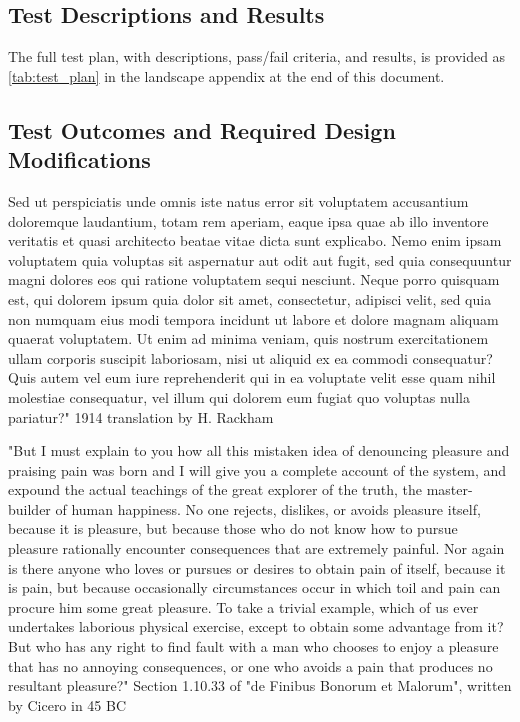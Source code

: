 \subsection{Test Descriptions and Results}
\label{subsec:tp_descriptions}

The full test plan, with descriptions, pass/fail criteria, and results, is
provided as \autoref{tab:test_plan} in the landscape appendix at the end of
this document.

\subsection{Test Outcomes and Required Design Modifications}
\label{subsec:tp_outcomes_design_modifications}

\label{subsec:tp_timeline}

Sed ut perspiciatis unde omnis iste natus error sit voluptatem accusantium doloremque laudantium, totam rem aperiam, eaque ipsa quae ab illo inventore veritatis et quasi architecto beatae vitae dicta sunt explicabo. Nemo enim ipsam voluptatem quia voluptas sit aspernatur aut odit aut fugit, sed quia consequuntur magni dolores eos qui ratione voluptatem sequi nesciunt. Neque porro quisquam est, qui dolorem ipsum quia dolor sit amet, consectetur, adipisci velit, sed quia non numquam eius modi tempora incidunt ut labore et dolore magnam aliquam quaerat voluptatem. Ut enim ad minima veniam, quis nostrum exercitationem ullam corporis suscipit laboriosam, nisi ut aliquid ex ea commodi consequatur? Quis autem vel eum iure reprehenderit qui in ea voluptate velit esse quam nihil molestiae consequatur, vel illum qui dolorem eum fugiat quo voluptas nulla pariatur?"
1914 translation by H. Rackham

"But I must explain to you how all this mistaken idea of denouncing pleasure and praising pain was born and I will give you a complete account of the system, and expound the actual teachings of the great explorer of the truth, the master-builder of human happiness. No one rejects, dislikes, or avoids pleasure itself, because it is pleasure, but because those who do not know how to pursue pleasure rationally encounter consequences that are extremely painful. Nor again is there anyone who loves or pursues or desires to obtain pain of itself, because it is pain, but because occasionally circumstances occur in which toil and pain can procure him some great pleasure. To take a trivial example, which of us ever undertakes laborious physical exercise, except to obtain some advantage from it? But who has any right to find fault with a man who chooses to enjoy a pleasure that has no annoying consequences, or one who avoids a pain that produces no resultant pleasure?"
Section 1.10.33 of "de Finibus Bonorum et Malorum", written by Cicero in 45 BC

